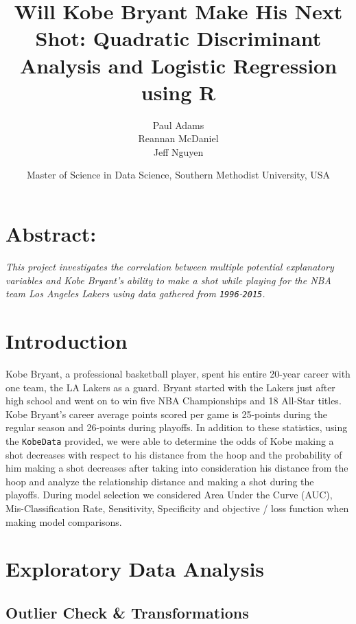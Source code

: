 \documentclass[american,]{article}
\title{Will Kobe Bryant Make His Next Shot: Quadratic Discriminant Analysis and Logistic Regression using R}
\author{Paul Adams \\ Reannan McDaniel \\ Jeff Nguyen}
\date{Master of Science in Data Science, Southern Methodist University, USA}
\begin{document}
\maketitle

{
\setcounter{tocdepth}{2}
\tableofcontents
}
\newpage

\hypertarget{abstract}{%
\section{\texorpdfstring{\textbf{Abstract:}}{Abstract:}}\label{abstract}}

\emph{This project investigates the correlation between multiple potential explanatory variables and Kobe Bryant's ability to make a shot while playing for the NBA team Los Angeles Lakers using data gathered from \texttt{1996}-\texttt{2015}.}

\hypertarget{introduction}{%
\section{\texorpdfstring{\textbf{Introduction}}{Introduction}}\label{introduction}}

Kobe Bryant, a professional basketball player, spent his entire 20-year career with one team, the LA Lakers as a guard. Bryant started with the Lakers just after high school and went on to win five NBA Championships and 18 All-Star titles. Kobe Bryant's career average points scored per game is 25-points during the regular season and 26-points during playoffs. In addition to these statistics, using the \texttt{KobeData} provided, we were able to determine the odds of Kobe making a shot decreases with respect to his distance from the hoop and the probability of him making a shot decreases after taking into consideration his distance from the hoop and analyze the relationship distance and making a shot during the playoffs. During model selection we considered Area Under the Curve (AUC), Mis-Classification Rate, Sensitivity, Specificity and objective / loss function when making model comparisons.

\hypertarget{exploratory-data-analysis}{%
\section{\texorpdfstring{\textbf{Exploratory Data Analysis}}{Exploratory Data Analysis}}\label{exploratory-data-analysis}}

\hypertarget{outlier-check-transformations}{%
\subsection{\texorpdfstring{\textbf{Outlier Check \& Transformations}}{Outlier Check \& Transformations}}\label{outlier-check-transformations}}
\end{document}

